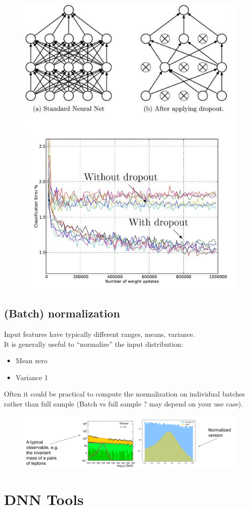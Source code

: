 \begin{figure}[ht]
	\centering
	\includegraphics[width=0.5\linewidth]{figure_ml/dropout.png}
\end{figure}


\subsection{(Batch) normalization}
Input features have typically different ranges, means, variance.\\
It is generally useful to “normalize” the input distribution:
\begin{itemize}
	\item Mean zero
	\item Variance 1
\end{itemize}

Often it could be practical to compute the normalization on individual batches rather than full sample (Batch vs full sample ? may depend on your use case).

\begin{figure}[ht]
	\centering
	\includegraphics[width=0.8\linewidth]{figure_ml/batch_norm.png}
\end{figure}
\FloatBarrier

\section{DNN Tools}


